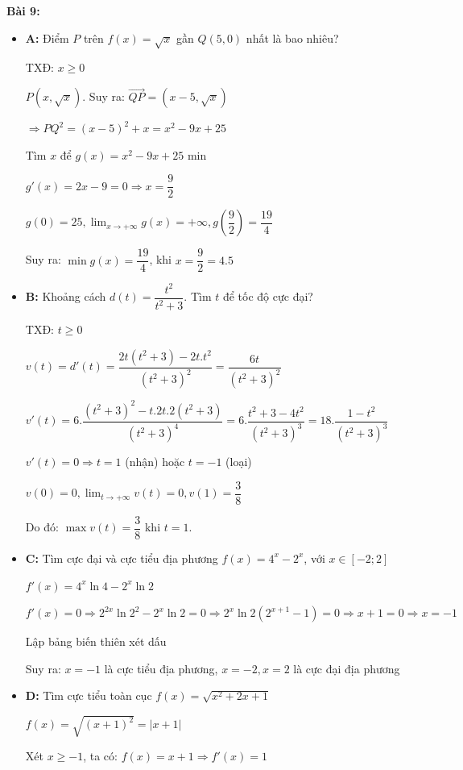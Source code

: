 \documentclass[12pt,a4paper]{article}
\begin{document}
\textbf{Bài 9:}

\begin{itemize}
    \item \textbf{A:} Điểm $P$ trên $f(x)=\sqrt{x}$ gần $Q(5,0)$ nhất là bao nhiêu?

    TXĐ: $x \ge 0$

    $P(x, \sqrt{x})$. Suy ra: $\overrightarrow{QP} = (x - 5, \sqrt{x})$

    $\Rightarrow PQ^2 = (x - 5)^2 + x = x^2 -9x + 25$

    Tìm $x$ để $g(x) = x^2 -9x + 25$ min

    $g'(x) = 2x - 9 = 0 \Rightarrow x = \dfrac{9}{2}$

    $g(0) = 25, \lim_{x \to +\infty} g(x) = +\infty, g(\dfrac{9}{2}) = \dfrac{19}{4}$

    Suy ra: $\min g(x) = \dfrac{19}{4}$, khi $x=\dfrac{9}{2}= 4.5$
    \item \textbf{B:} Khoảng cách $d(t)=\dfrac{t^2}{t^2+3}$. Tìm $t$ để tốc độ cực đại?

    TXĐ: $t \ge 0$

    $v(t) = d'(t) = \dfrac{2t(t^2 + 3) - 2t.t^2}{(t^2 + 3)^2} = \dfrac{6t}{(t^2 + 3)^2}$

    $v'(t) = 6.\dfrac{(t^2 + 3)^2 - t.2t.2(t^2 + 3)}{(t^2 + 3)^4} = 6. \dfrac{t^2 + 3 - 4t^2}{(t^2 + 3)^3} = 18.\dfrac{1 - t^2}{(t^2 + 3)^3}$

    $v'(t) = 0 \Rightarrow t = 1$ (nhận) hoặc $t = -1$ (loại)

    $v(0) = 0, \lim_{t \to +\infty} v(t) = 0, v(1) = \dfrac{3}{8}$

    Do đó: $\max v(t) = \dfrac{3}{8}$ khi $t=1$.
    \item \textbf{C:} Tìm cực đại và cực tiểu địa phương $f(x) = 4^x - 2^x$, với $x \in [-2;2]$

    $f'(x) = 4^x\ln 4 - 2^x \ln 2$
    
    $f'(x) = 0 \Rightarrow 2^{2x} \ln 2^2 - 2^x \ln 2 = 0 \Rightarrow 2^x \ln 2(2^{x + 1} - 1) = 0 \Rightarrow x + 1 = 0 \Rightarrow x = -1$

    Lập bảng biến thiên xét dấu

    Suy ra: $x = -1$ là cực tiểu địa phương, $x = -2, x = 2$ là cực đại địa phương
    \item \textbf{D:} Tìm cực tiểu toàn cục $f(x)=\sqrt{x^2+2x+1}$

    $f(x) = \sqrt{(x + 1)^2} = |x + 1|$

    Xét $x \ge -1$, ta có: $f(x) = x + 1 \Rightarrow f'(x) = 1$


\end{itemize}
\end{document}
